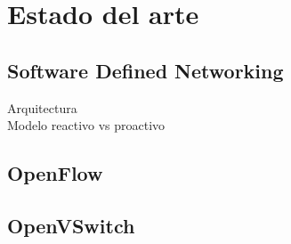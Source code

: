 \chapter{Estado del arte}

\graphicspath{{Chapter2/Figs/}}

\section{Software Defined Networking}
Arquitectura \\
Modelo reactivo vs proactivo \\



\section{OpenFlow}



\section{OpenVSwitch}








